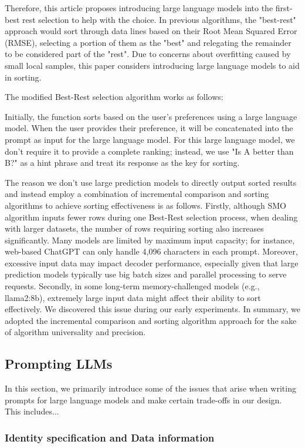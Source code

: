 \documentclass{ieeeaccess}
\begin{document}
Therefore, this article proposes introducing large language models into the first-best rest selection to help with the choice. In previous algorithms, the "best-rest" approach would sort through data lines based on their Root Mean Squared Error (RMSE), selecting a portion of them as the "best" and relegating the remainder to be considered part of the "rest". Due to concerns about overfitting caused by small local samples, this paper considers introducing large language models to aid in sorting.

The modified Best-Rest selection algorithm works as follows:

Initially, the function sorts based on the user's preferences using a large language model. When the user provides their preference, it will be concatenated into the prompt as input for the large language model. For this large language model, we don't require it to provide a complete ranking; instead, we use "Is A better than B?" as a hint phrase and treat its response as the key for sorting.

The reason we don't use large prediction models to directly output sorted results and instead employ a combination of incremental comparison and sorting algorithms to achieve sorting effectiveness is as follows. Firstly, although SMO algorithm inputs fewer rows during one Best-Rest selection process, when dealing with larger datasets, the number of rows requiring sorting also increases significantly. Many models are limited by maximum input capacity; for instance, web-based ChatGPT can only handle 4,096 characters in each prompt. Moreover, excessive input data may impact decoder performance, especially given that large prediction models typically use big batch sizes and parallel processing to serve requests. Secondly, in some long-term memory-challenged models (e.g., llama2:8b), extremely large input data might affect their ability to sort effectively. We discovered this issue during our early experiments. In summary, we adopted the incremental comparison and sorting algorithm approach for the sake of algorithm universality and precision.

\subsection{Prompting LLMs}
In this section, we primarily introduce some of the issues that arise when writing prompts for large language models and make certain trade-offs in our design. This includes...

\subsubsection{Identity specification and Data information}
\end{document}
